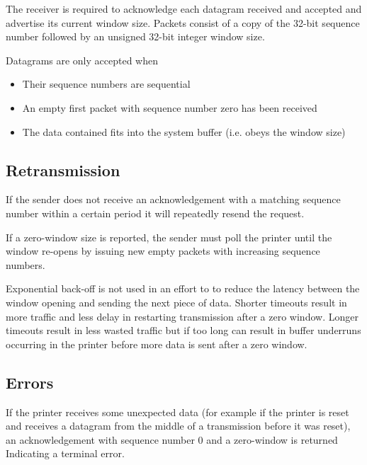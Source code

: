 			The receiver is required to acknowledge each datagram received and
			accepted and advertise its current window size. Packets consist of a copy
			of the 32-bit sequence number followed by an unsigned 32-bit integer
			window size.
			
			Datagrams are only accepted when
			\begin{itemize}
				
				\item Their sequence numbers are sequential
				
				\item An empty first packet with sequence number zero has been received
				
				\item The data contained fits into the system buffer (i.e. obeys the
				window size)
				
			\end{itemize}
			
		\subsection{Retransmission}
			
			If the sender does not receive an acknowledgement with a matching sequence
			number within a certain period it will repeatedly resend the request.
			
			If a zero-window size is reported, the sender must poll the printer until
			the window re-opens by issuing new empty packets with increasing sequence
			numbers.
			
			Exponential back-off is not used in an effort to to reduce the latency
			between the window opening and sending the next piece of data. Shorter
			timeouts result in more traffic and less delay in restarting transmission
			after a zero window. Longer timeouts result in less wasted traffic but if
			too long can result in buffer underruns occurring in the printer before
			more data is sent after a zero window.
			
		\subsection{Errors}
			
			If the printer receives some unexpected data (for example if the printer
			is reset and receives a datagram from the middle of a transmission before
			it was reset), an acknowledgement with sequence number 0 and a zero-window
			is returned Indicating a terminal error.
			
